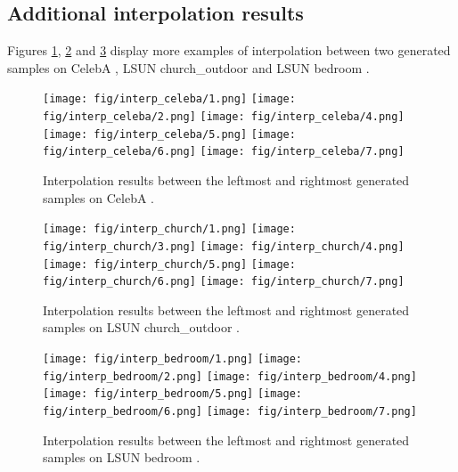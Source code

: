 \documentclass{article} \usepackage{iclr2021_conference,times}
\begin{document}
\subsection{Additional interpolation results} \label{app:interp}
Figures \ref{fig: interp-celeba}, \ref{fig: interp-church} and \ref{fig: interp-bedroom} display more examples of interpolation between two generated samples on CelebA , LSUN church\_outdoor  and LSUN bedroom .
\begin{figure}[ht]
\begin{center}
\texttt{[image: fig/interp\_celeba/1.png]}
\texttt{[image: fig/interp\_celeba/2.png]}
\texttt{[image: fig/interp\_celeba/4.png]}
\texttt{[image: fig/interp\_celeba/5.png]}
\texttt{[image: fig/interp\_celeba/6.png]}
\texttt{[image: fig/interp\_celeba/7.png]}
\end{center}
\caption{Interpolation results between the leftmost and rightmost generated samples on CelebA . }
\label{fig: interp-celeba}
\end{figure}
\begin{figure}[ht]
\begin{center}
\texttt{[image: fig/interp\_church/1.png]}
\texttt{[image: fig/interp\_church/3.png]}
\texttt{[image: fig/interp\_church/4.png]}
\texttt{[image: fig/interp\_church/5.png]}
\texttt{[image: fig/interp\_church/6.png]}
\texttt{[image: fig/interp\_church/7.png]}
\end{center}
\caption{Interpolation results between the leftmost and rightmost generated samples on LSUN church\_outdoor . }
\label{fig: interp-church}
\end{figure}

\begin{figure}[ht]
\begin{center}
\texttt{[image: fig/interp\_bedroom/1.png]}
\texttt{[image: fig/interp\_bedroom/2.png]}
\texttt{[image: fig/interp\_bedroom/4.png]}
\texttt{[image: fig/interp\_bedroom/5.png]}
\texttt{[image: fig/interp\_bedroom/6.png]}
\texttt{[image: fig/interp\_bedroom/7.png]}
\end{center}
\caption{Interpolation results between the leftmost and rightmost generated samples on LSUN bedroom . }
\label{fig: interp-bedroom}
\end{figure}
\end{document}
